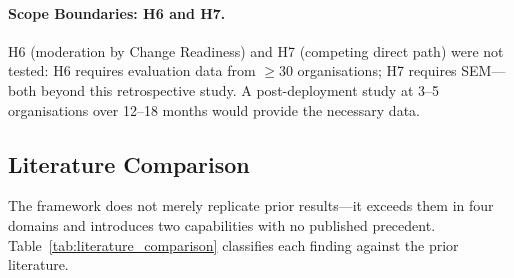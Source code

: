 \paragraph{Scope Boundaries: H6 and H7.}

H6 (moderation by Change Readiness) and H7 (competing direct path) were not tested: H6 requires evaluation data from $\geq$30 organisations; H7 requires SEM---both beyond this retrospective study. A post-deployment study at 3--5 organisations over 12--18 months would provide the necessary data.

\subsection{Literature Comparison}

The framework does not merely replicate prior results---it exceeds them in four domains and introduces two capabilities with no published precedent. Table~\ref{tab:literature_comparison} classifies each finding against the prior literature.

%

